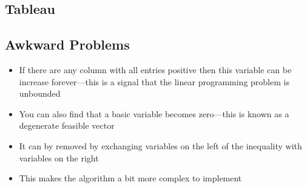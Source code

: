 
\begin{slide}
\section[-2]{Tableau}

\pb
\pause {}
\begin{center}
  \pause
\end{center}
\end{slide}


\begin{slide}
\section{Awkward Problems}

\begin{PauseHighLight}
  \begin{itemize}
  \item If there are any column with all entries positive then this
    variable can be increase forever---this is a signal that the linear
    programming problem is unbounded\pause
  \item You can also find that a basic variable becomes zero---this is
    known as a degenerate feasible vector\pause
  \item It can by removed by exchanging variables on the left of the
    inequality with variables on the right\pause
  \item This makes the algorithm a bit more complex to implement\pause
  \end{itemize}
\end{PauseHighLight}

\end{slide}

